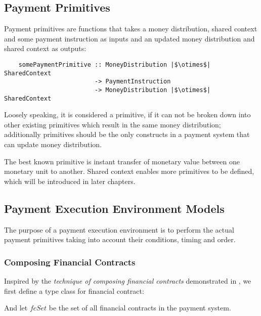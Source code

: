 \documentclass[a4paper,10pt]{report}
\begin{document}



\subsection{Payment Primitives}

Payment primitives are functions that takes a money distribution, shared context and some payment instruction as inputs
and an updated money distribution and shared context as outputs:

\begin{verbatim}
    somePaymentPrimitive :: MoneyDistribution |$\otimes$| SharedContext
                         -> PaymentInstruction
                         -> MoneyDistribution |$\otimes$| SharedContext
\end{verbatim}

Loosely speaking, it is considered a primitive, if it can not be broken down into other existing primitives which result
in the same money distribution; additionally primitives should be the only constructs in a payment system that can
update money distribution.

The best known primitive is instant transfer of monetary value between one monetary unit to another. Shared context
enables more primitives to be defined, which will be introduced in later chapters.


\subsection{Payment Execution Environment Models}

The purpose of a payment execution environment is to perform the actual payment primitives taking into account their
conditions, timing and order.

\subsubsection{Composing Financial Contracts}

Inspired by the \textit{technique of composing financial contracts} demonstrated in \cite{peyton2000composing}, we first
define a type class for financial contract:



And let $fcSet$ be the set of all financial contracts in the payment system.
\end{document}

